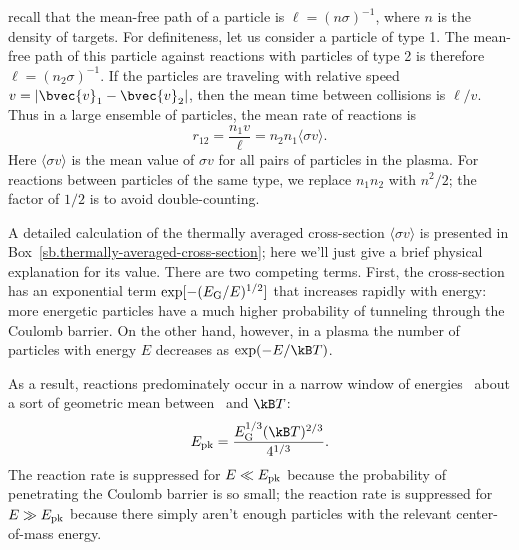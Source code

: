  recall that the mean-free path of a particle is $\ell = (n\sigma)^{-1}$, where $n$ is the density of targets. For definiteness, let us consider a particle of type 1. The mean-free path of this particle against reactions with particles of type 2 is therefore $\ell = (n_{2}\sigma)^{-1}$. If the particles are traveling with relative speed $v = |\bvec{v}_{1}-\bvec{v}_{2}|$, then the mean time between collisions is $\ell/v$. Thus in a large ensemble of particles, the mean rate of reactions is
\[
	r_{12} = \frac{n_{1} v}{\ell} = n_{2}n_{1}\langle\sigma v\rangle.
\]
Here $\langle \sigma v\rangle$ is the mean value of $\sigma v$ for all pairs of particles in the plasma.
For reactions between particles of the same type, we replace $n_{1}n_{2}$ with $n^{2}/2$; the factor of $1/2$ is to avoid double-counting.

A detailed calculation of the thermally averaged cross-section $\langle\sigma v\rangle$ is presented in Box~\ref{sb.thermally-averaged-cross-section}; here we'll just give a brief physical explanation for its value. There are two competing terms. First, the cross-section has an exponential term $\exp[-(E_{\mathrm{G}}/E)^{1/2}]$ that increases rapidly with energy: more energetic particles have a much higher probability of tunneling through the Coulomb barrier. On the other hand, however, in a plasma the number of particles with energy $E$ decreases as $\exp(-E/\kB T)$.

As a result, reactions predominately occur in a narrow window of energies \Epk\ about a sort of geometric mean between \EG\ and $\kB T$:
\[	\Epk = \frac{\EG^{1/3}(\kB T)^{2/3}}{4^{1/3}}. \]
The reaction rate is suppressed for $E\ll E_{\mathrm{pk}}$ because the probability of penetrating the Coulomb barrier is so small; the reaction rate is suppressed for $E\gg E_{\mathrm{pk}}$ because there simply aren't enough particles with the relevant center-of-mass energy.

